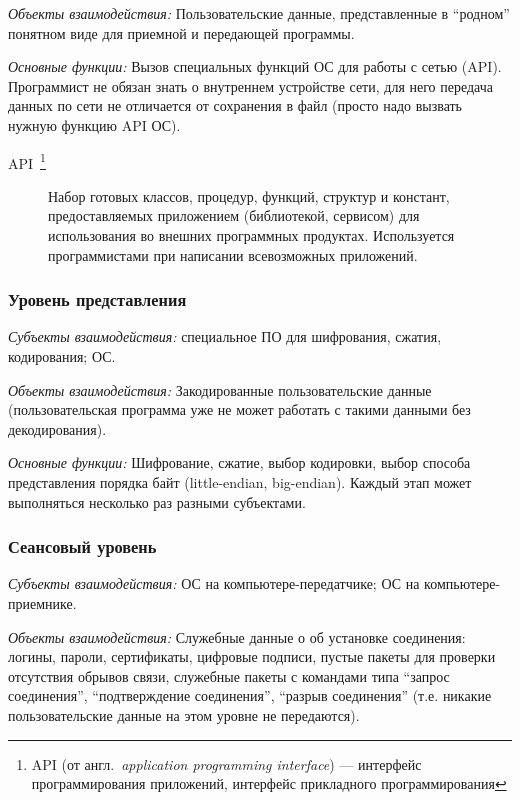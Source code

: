 \emph{Объекты взаимодействия:} Пользовательские данные, представленные в \enquote{родном} понятном виде для приемной и передающей программы.

\emph{Основные функции:} Вызов специальных функций ОС для работы с сетью (API). Программист не обязан знать о внутреннем устройстве
сети, для него передача данных по сети не отличается от сохранения в файл (просто надо вызвать нужную функцию API ОС).

\begin{description}
    \item [API~\footnote{API (от англ.\ \emph{application programming interface}) --- интерфейс программирования приложений, интерфейс прикладного программирования}]
          Набор готовых классов, процедур, функций, структур и констант, предоставляемых приложением (библиотекой, сервисом) для использования во внешних программных продуктах.
          Используется программистами при написании всевозможных приложений.
\end{description}

\subsubsection*{Уровень представления}\label{subsubsec:presentation-layer}
\emph{Субъекты взаимодействия:} специальное ПО для шифрования, сжатия, кодирования; ОС.

\emph{Объекты взаимодействия:} Закодированные пользовательские данные (пользовательская программа уже не может работать с такими данными без декодирования).

\emph{Основные функции:} Шифрование, сжатие, выбор кодировки, выбор способа представления порядка байт (little-endian, big-endian).
Каждый этап может выполняться несколько раз разными субъектами.

\subsubsection*{Сеансовый уровень}\label{subsubsec:session-layer}

\emph{Субъекты взаимодействия:} ОС на компьютере-передатчике; ОС на компьютере-приемнике.

\emph{Объекты взаимодействия:} Служебные данные о об установке соединения: логины, пароли, сертификаты, цифровые подписи, пустые пакеты для проверки отсутствия обрывов связи, служебные пакеты с командами типа \enquote{запрос соединения}, \enquote{подтверждение соединения}, \enquote{разрыв соединения} (т.е. никакие пользовательские данные на этом уровне не передаются).

